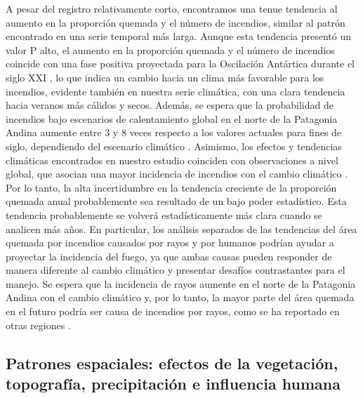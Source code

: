 A pesar del registro relativamente corto, encontramos una tenue tendencia al aumento en la proporción quemada y el número de incendios, similar al patrón encontrado en una serie temporal más larga. Aunque esta tendencia presentó un valor P alto, el aumento en la proporción quemada y el número de incendios coincide con una fase positiva proyectada para la Oscilación Antártica durante el siglo XXI \citep{thompson_signatures_2011}, lo que indica un cambio hacia un clima más favorable para los incendios, evidente también en nuestra serie climática, con una clara tendencia hacia veranos más cálidos y secos. Además, se espera que la probabilidad de incendios bajo escenarios de calentamiento global en el norte de la Patagonia Andina aumente entre 3 y 8 veces respecto a los valores actuales para fines de siglo, dependiendo del escenario climático \citep{kitzberger_projections_2022}. Asimismo, los efectos y tendencias climáticas encontrados en nuestro estudio coinciden con observaciones a nivel global, que asocian una mayor incidencia de incendios con el cambio climático \citep{wang_increasing_2015, robinne_global_2018, ellis_global_2022, lund_influence_2023}. Por lo tanto, la alta incertidumbre en la tendencia creciente de la proporción quemada anual probablemente sea resultado de un bajo poder estadístico. Esta tendencia probablemente se volverá estadísticamente más clara cuando se analicen más años. En particular, los análisis separados de las tendencias del área quemada por incendios causados por rayos y por humanos podrían ayudar a proyectar la incidencia del fuego, ya que ambas causas pueden responder de manera diferente al cambio climático y presentar desafíos contrastantes para el manejo. Se espera que la incidencia de rayos aumente en el norte de la Patagonia Andina con el cambio climático \citep{veblen_historical_2008} y, por lo tanto, la mayor parte del área quemada en el futuro podría ser causa de incendios por rayos, como se ha reportado en otras regiones \citep{miller2012trends, cattau2020anthropogenic}.

\subsection{Patrones espaciales: efectos de la vegetación, topografía, precipitación e influencia humana}

